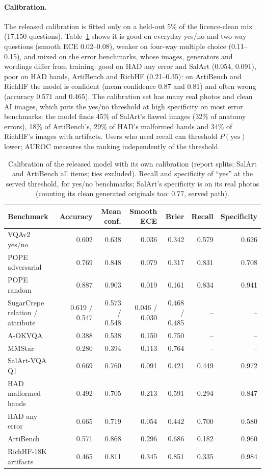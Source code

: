 \documentclass[10pt]{article}
\begin{document}
\paragraph{Calibration.} The released calibration is fitted only on a held-out 5\% of the licence-clean mix (17{,}150 questions). Table~\ref{tab:calib} shows it is good on everyday yes/no and two-way questions (smooth ECE 0.02--0.08), weaker on four-way multiple choice (0.11--0.15), and mixed on the error benchmarks, whose images, generators and wordings differ from training: good on HAD any error and SalArt (0.054, 0.091), poor on HAD hands, ArtiBench and RichHF (0.21--0.35): on ArtiBench and RichHF the model is confident (mean confidence 0.87 and 0.81) and often wrong (accuracy 0.571 and 0.465). The calibration set has many real photos and clean AI images, which puts the yes/no threshold at high specificity on most error benchmarks: the model finds 45\% of SalArt's flawed images (32\% of anatomy errors), 18\% of ArtiBench's, 29\% of HAD's malformed hands and 34\% of RichHF's images with artifacts. Users who need recall can threshold $P(\text{yes})$ lower; AUROC measures the ranking independently of the threshold.

\begin{table}[t]
\centering\footnotesize
\caption{Calibration of the released model with its own calibration (report splits; SalArt and ArtiBench all items; ties excluded). Recall and specificity of ``yes'' at the served threshold, for yes/no benchmarks; SalArt's specificity is on its real photos (counting its clean generated originals too: 0.77, served path).}
\label{tab:calib}
\setlength\tabcolsep{4pt}
\begin{tabular}{lrrrrrr}
\toprule
Benchmark & Accuracy & Mean conf. & Smooth ECE & Brier & Recall & Specificity \\
\midrule
VQAv2 yes/no & 0.602 & 0.638 & 0.036 & 0.342 & 0.579 & 0.626 \\
POPE adversarial & 0.769 & 0.848 & 0.079 & 0.317 & 0.831 & 0.708 \\
POPE random & 0.887 & 0.903 & 0.019 & 0.161 & 0.834 & 0.941 \\
SugarCrepe relation / attribute & 0.619 / 0.547 & 0.573 / 0.548 & 0.046 / 0.030 & 0.468 / 0.485 & -- & -- \\
A-OKVQA & 0.388 & 0.538 & 0.150 & 0.750 & -- & -- \\
MMStar & 0.280 & 0.394 & 0.113 & 0.764 & -- & -- \\
\midrule
SalArt-VQA Q1 & 0.669 & 0.760 & 0.091 & 0.421 & 0.449 & 0.972 \\
HAD malformed hands & 0.492 & 0.705 & 0.213 & 0.591 & 0.294 & 0.847 \\
HAD any error & 0.665 & 0.719 & 0.054 & 0.442 & 0.700 & 0.580 \\
ArtiBench & 0.571 & 0.868 & 0.296 & 0.686 & 0.182 & 0.960 \\
RichHF-18K artifacts & 0.465 & 0.811 & 0.345 & 0.851 & 0.335 & 0.984 \\
\bottomrule
\end{tabular}
\end{table}
\end{document}

